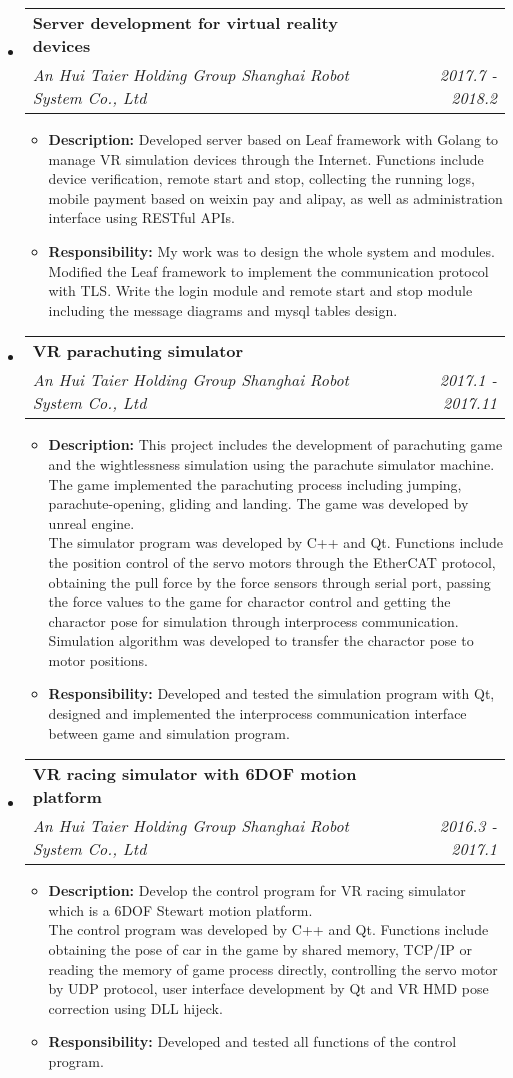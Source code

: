 \documentclass[letterpaper,11pt]{article}
\makeatletter
\newcommand{\resitem}[1]{\item #1 \vspace{-2pt}}
\newcommand{\ressubheading}[4]{
\begin{tabular*}{6.5in}{l@{\cftdotfill{\cftsecdotsep}\extracolsep{\fill}}r}
		\textbf{#1} & #2 \\
		\textit{#3} & \textit{#4} \\
\end{tabular*}\vspace{-6pt}}
\makeatother
\begin{document}
\begin{itemize}

\item
	\ressubheading{Server development for virtual reality devices}{}{An Hui Taier Holding Group Shanghai Robot System Co., Ltd}{2017.7 - 2018.2}
	\begin{itemize}
		\resitem{ {\bf Description:} Developed server based on Leaf framework with Golang to manage VR simulation devices through the Internet. Functions include device verification, remote start and stop, collecting the running logs, mobile payment based on weixin pay and alipay, as well as administration interface using RESTful APIs.}
		\resitem{ {\bf Responsibility:} My work was to design the whole system and modules. Modified the Leaf framework to implement the communication protocol with TLS. Write the login module and remote start and stop module including the message diagrams and mysql tables design.}
	  \end{itemize}

\item
	\ressubheading{VR parachuting simulator}{}{An Hui Taier Holding Group Shanghai Robot System Co., Ltd}{2017.1 - 2017.11}
	\begin{itemize}
		\resitem{ {\bf Description:} This project includes the development of parachuting game and the wightlessness simulation using the parachute simulator machine.\\
		The game implemented the parachuting process including jumping, parachute-opening, gliding and landing. The game was developed by unreal engine.\\
		The simulator program was developed by C++ and Qt. Functions include the position control of the servo motors through the EtherCAT protocol, obtaining the pull force by the force sensors through serial port, passing the force values to the game for charactor control and getting the charactor pose for simulation through interprocess communication. Simulation algorithm was developed to transfer the charactor pose to motor positions.}
		\resitem{ {\bf Responsibility:} Developed and tested the simulation program with Qt, designed and implemented the interprocess communication interface between game and simulation program.}
	\end{itemize}

\item
	\ressubheading{VR racing simulator with 6DOF motion platform}{}{An Hui Taier Holding Group Shanghai Robot System Co., Ltd}{2016.3 - 2017.1}
	\begin{itemize}
		\resitem{ {\bf Description:} Develop the control program for VR racing simulator which is a 6DOF Stewart motion platform.\\
		The control program was developed by C++ and Qt. Functions include obtaining the pose of car in the game by shared memory, TCP/IP or reading the memory of game process directly, controlling the servo motor by UDP protocol, user interface development by Qt and VR HMD pose correction using DLL hijeck.}
		\resitem{ {\bf Responsibility:} Developed and tested all functions of the control program.}
	\end{itemize}


\end{itemize}
\end{document}
